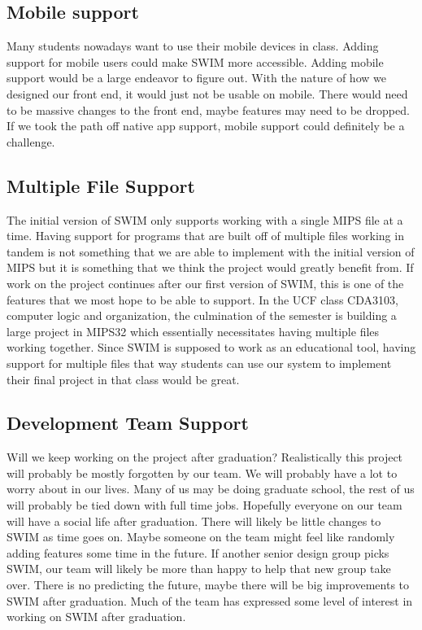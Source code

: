\documentclass[parskip=half, fontsize=12pt]{scrartcl}
\begin{document}
\subsection{Mobile support}

Many students nowadays want to use their mobile devices in class. Adding
support for mobile users could make SWIM more accessible. Adding mobile
support would be a large endeavor to figure out. With the nature of how
we designed our front end, it would just not be usable on mobile. There
would need to be massive changes to the front end, maybe features may
need to be dropped. If we took the path off native app support, mobile
support could definitely be a challenge.

\subsection{Multiple File Support}

The initial version of SWIM only supports working with a single MIPS
file at a time. Having support for programs that are built off of
multiple files working in tandem is not something that we are able to
implement with the initial version of MIPS but it is something that we
think the project would greatly benefit from. If work on the project
continues after our first version of SWIM, this is one of the features
that we most hope to be able to support. In the UCF class CDA3103,
computer logic and organization, the culmination of the semester is
building a large project in MIPS32 which essentially necessitates having
multiple files working together. Since SWIM is supposed to work as an
educational tool, having support for multiple files that way students
can use our system to implement their final project in that class would
be great.

\subsection{Development Team Support}

Will we keep working on the project after graduation? Realistically this
project will probably be mostly forgotten by our team. We will probably
have a lot to worry about in our lives. Many of us may be doing graduate
school, the rest of us will probably be tied down with full time jobs.
Hopefully everyone on our team will have a social life after graduation.
There will likely be little changes to SWIM as time goes on. Maybe
someone on the team might feel like randomly adding features some time
in the future. If another senior design group picks SWIM, our team will
likely be more than happy to help that new group take over. There is no
predicting the future, maybe there will be big improvements to SWIM
after graduation. Much of the team has expressed some level of interest
in working on SWIM after graduation.


\printbibliography
\end{document}
